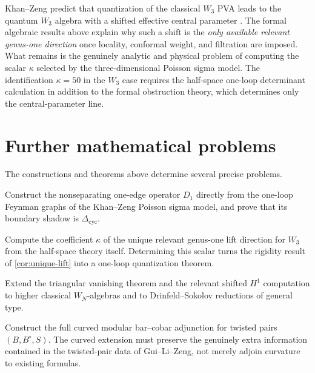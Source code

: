 Khan--Zeng predict that quantization of the classical $W_3$ PVA leads to the quantum $W_3$
algebra with a shifted effective central parameter \cite{KZ25}. The formal algebraic
results above explain why such a shift is the \emph{only available relevant
genus-one direction} once locality, conformal weight, and filtration are imposed. What
remains is the genuinely analytic and physical problem of computing the scalar $\kappa$
selected by the three-dimensional Poisson sigma model. The identification
$\kappa=50$ in the $W_3$ case requires the half-space one-loop determinant calculation
in addition to the formal obstruction theory, which determines only the
central-parameter line.

\section{Further mathematical problems}

The constructions and theorems above determine several precise problems.

\begin{question}
Construct the nonseparating one-edge operator $D_1$ directly from the one-loop Feynman
graphs of the Khan--Zeng Poisson sigma model, and prove that its boundary shadow is
$\Delta_{\mathrm{cyc}}$.
\end{question}

\begin{question}
Compute the coefficient $\kappa$ of the unique relevant genus-one lift direction for
$W_3$ from the half-space theory itself. Determining this scalar turns the rigidity
result of \cref{cor:unique-lift} into a one-loop quantization theorem.
\end{question}

\begin{question}[Beyond $W_3$]
Extend the triangular vanishing theorem and the relevant shifted $H^1$ computation to
higher classical $W_N$-algebras and to Drinfeld--Sokolov reductions of general type.
\end{question}

\begin{question}
Construct the full curved modular bar--cobar adjunction for twisted pairs $(B,B^\circ,S)$.
The curved extension must preserve the genuinely
extra information contained in the twisted-pair data of Gui--Li--Zeng, not merely adjoin curvature to existing formulas.
\end{question}

